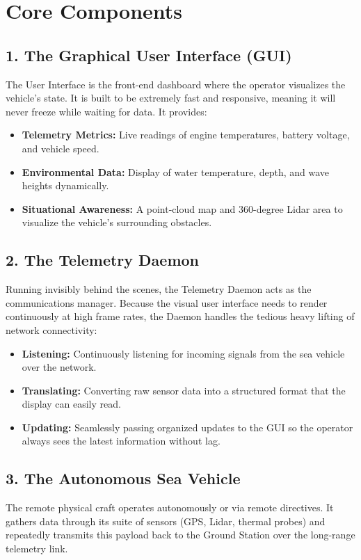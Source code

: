 \documentclass[12pt,a4paper]{article}
\begin{document}
\section{Core Components}

\subsection{1. The Graphical User Interface (GUI)}
The User Interface is the front-end dashboard where the operator visualizes the vehicle's state. It is built to be extremely fast and responsive, meaning it will never freeze while waiting for data. It provides:
\begin{itemize}
    \item \textbf{Telemetry Metrics:} Live readings of engine temperatures, battery voltage, and vehicle speed.
    \item \textbf{Environmental Data:} Display of water temperature, depth, and wave heights dynamically.
    \item \textbf{Situational Awareness:} A point-cloud map and 360-degree Lidar area to visualize the vehicle's surrounding obstacles.
\end{itemize}

\subsection{2. The Telemetry Daemon}
Running invisibly behind the scenes, the Telemetry Daemon acts as the communications manager. Because the visual user interface needs to render continuously at high frame rates, the Daemon handles the tedious heavy lifting of network connectivity:
\begin{itemize}
    \item \textbf{Listening:} Continuously listening for incoming signals from the sea vehicle over the network.
    \item \textbf{Translating:} Converting raw sensor data into a structured format that the display can easily read.
    \item \textbf{Updating:} Seamlessly passing organized updates to the GUI so the operator always sees the latest information without lag.
\end{itemize}

\subsection{3. The Autonomous Sea Vehicle}
The remote physical craft operates autonomously or via remote directives. It gathers data through its suite of sensors (GPS, Lidar, thermal probes) and repeatedly transmits this payload back to the Ground Station over the long-range telemetry link.
\end{document}
